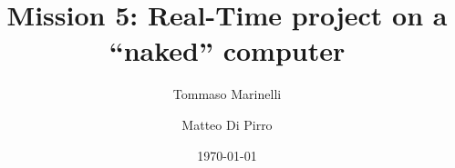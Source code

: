 \documentclass[a4paper,10pt]{article}
\begin{document}
\title{Mission 5: Real-Time project on a ``naked'' computer}
\author{Tommaso Marinelli \and Matteo Di Pirro}
\date{\today}

\maketitle





\end{document}
